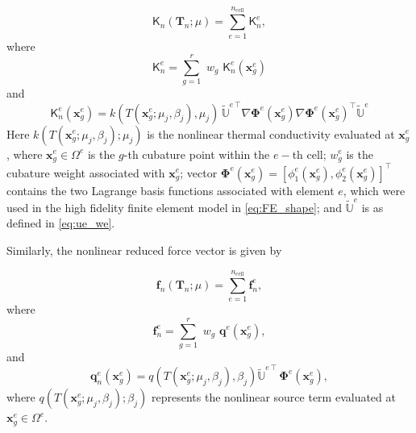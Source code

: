 \documentclass[11pt]{article}
\renewcommand{\vec}[1]{\mathbf{#1}}
\newcommand{\mat}[1]{\mathsf{#1}}
\begin{document}
\begin{equation}
	\mat{K}_n(\mathbf{T}_n; \mu)  = \sum_{e=1}^{n_{\text{cell}}} \mat{K}^e_n,
	\label{eq:elemental_contrib_K_red}
\end{equation}
where
\begin{equation}
\mat{K}_n^e = \sum_{g=1}^{r}\,\,w_g\,\, \mat{K}_n^e(\vec{x}^e_g)
\end{equation}
and
\begin{equation}
\mathsf{K}_n^e(\vec{x}^e_g) =  k({T}(\vec{x}^{e}_{g};\mu_j,\beta_j),\mu_j)\,\widetilde{\mathbb{U}}^{e\,\top}{\nabla \boldsymbol\Phi}^e(\vec{x}^{e}_g) {\nabla\boldsymbol\Phi}^e(\vec{x}^{e}_g)^\top\widetilde{\mathbb{U}}^e  
\label{eq:elemental_stiffness_matrix}
\end{equation}
Here $k({T}(\vec{x}^{e}_{g};\mu_j,\beta_j);\mu_j)$ is the nonlinear thermal conductivity evaluated at $\vec{x}^e_g$, where $\vec{x}^{e}_g\in \Omega^e$ is the $g$-th cubature point within the $e-$th cell; $w^{e}_g$ is the cubature weight associated with $\vec{x}^{e}_g$; vector $\boldsymbol\Phi^e(\vec{x}^{e}_g) = [\phi^{e}_1(\vec{x}^{e}_g),\phi^{e}_2(\vec{x}^{e}_g)]^\top$ contains the two Lagrange basis functions associated with element $e$, which were used in the high fidelity finite element model in \cref{eq:FE_shape}; and $\widetilde{\mathbb{U}}^e$ is as defined in \cref{eq:ue_we}.


Similarly, the nonlinear reduced force vector is given by

\begin{equation}
	\vec{f}_n(\mathbf{T}_n; \mu) = \sum_{e=1}^{n_{\text{cell}}} \vec{f}^e_n,
	\label{eq:elemental_contrib_f_red}
\end{equation}
where
\begin{equation}
	\vec{f}^e_n = \sum_{g=1}^{r} \,\, w_g \,\, \vec{q}^e(\vec{x}^e_g),
	\label{eq:elemental_force_vector}
\end{equation}
and
\begin{equation}
\vec{q}_n^e(\vec{x}^e_g) = q(T(\vec{x}^{e}_{g}; \mu_j, \beta_j),\beta_j) \widetilde{\mathbb{U}}^{e\,\top} \, \boldsymbol\Phi^{e}(\vec{x}^{e}_g),
\label{eq:source_term_expression}
\end{equation}
where \( q({T}(\vec{x}^{e}_{g};\mu_j,\beta_j);\beta_j) \) represents the nonlinear source term evaluated at $\vec{x}^e_g\in\Omega^e$.
\end{document}
